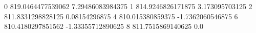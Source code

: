 0 819.0464477539062 7.29486083984375
1 814.9246826171875 3.173095703125
2 811.8331298828125 0.08154296875
4 810.015380859375 -1.7362060546875
6 810.4180297851562 -1.33355712890625
8 811.7515869140625 0.0
